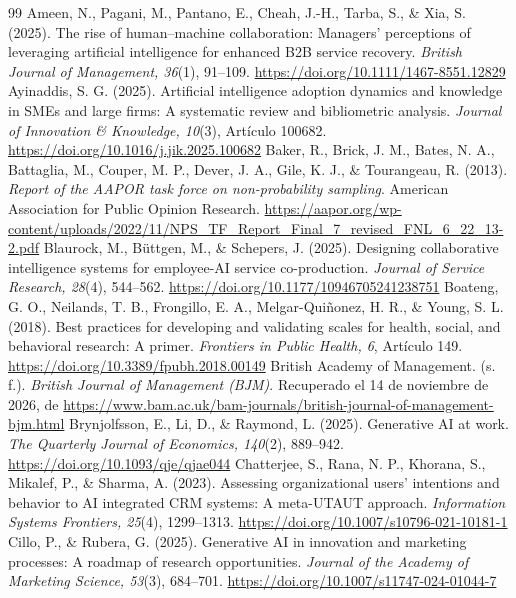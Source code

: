 \documentclass[12pt,letterpaper]{article}
\begin{document}
\clearpage
\begingroup{}\begin{thebibliography}{99}
 Ameen, N., Pagani, M., Pantano, E., Cheah, J.-H., Tarba, S., \& Xia, S. (2025). The rise of human--machine collaboration: Managers’ perceptions of leveraging artificial intelligence for enhanced B2B service recovery. \emph{British Journal of Management, 36}(1), 91--109. \url{https://doi.org/10.1111/1467-8551.12829}
 Ayinaddis, S. G. (2025). Artificial intelligence adoption dynamics and knowledge in SMEs and large firms: A systematic review and bibliometric analysis. \emph{Journal of Innovation \& Knowledge, 10}(3), Artículo 100682. \url{https://doi.org/10.1016/j.jik.2025.100682}
 Baker, R., Brick, J. M., Bates, N. A., Battaglia, M., Couper, M. P., Dever, J. A., Gile, K. J., \& Tourangeau, R. (2013). \emph{Report of the AAPOR task force on non-probability sampling}. American Association for Public Opinion Research. \url{https://aapor.org/wp-content/uploads/2022/11/NPS_TF_Report_Final_7_revised_FNL_6_22_13-2.pdf}
 Blaurock, M., Büttgen, M., \& Schepers, J. (2025). Designing collaborative intelligence systems for employee-AI service co-production. \emph{Journal of Service Research, 28}(4), 544--562. \url{https://doi.org/10.1177/10946705241238751}
 Boateng, G. O., Neilands, T. B., Frongillo, E. A., Melgar-Quiñonez, H. R., \& Young, S. L. (2018). Best practices for developing and validating scales for health, social, and behavioral research: A primer. \emph{Frontiers in Public Health, 6}, Artículo 149. \url{https://doi.org/10.3389/fpubh.2018.00149}
 British Academy of Management. (s. f.). \emph{British Journal of Management (BJM)}. Recuperado el 14 de noviembre de 2026, de \url{https://www.bam.ac.uk/bam-journals/british-journal-of-management-bjm.html}
 Brynjolfsson, E., Li, D., \& Raymond, L. (2025). Generative AI at work. \emph{The Quarterly Journal of Economics, 140}(2), 889--942. \url{https://doi.org/10.1093/qje/qjae044}
 Chatterjee, S., Rana, N. P., Khorana, S., Mikalef, P., \& Sharma, A. (2023). Assessing organizational users’ intentions and behavior to AI integrated CRM systems: A meta-UTAUT approach. \emph{Information Systems Frontiers, 25}(4), 1299--1313. \url{https://doi.org/10.1007/s10796-021-10181-1}
 Cillo, P., \& Rubera, G. (2025). Generative AI in innovation and marketing processes: A roadmap of research opportunities. \emph{Journal of the Academy of Marketing Science, 53}(3), 684--701. \url{https://doi.org/10.1007/s11747-024-01044-7}

\end{thebibliography}
\end{document}
